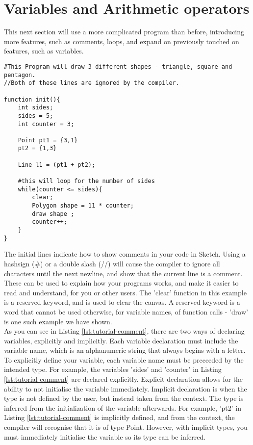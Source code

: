 \documentclass{l3proj}
\begin{document}
\section{Variables and Arithmetic operators}
\label{vars}
This next section will use a more complicated program than before, introducing more features, such as comments, loops, and expand on previously touched on features, such as variables.
\begin{lstlisting}[caption={Comments and Point Addition},label={lst:tutorial-comment}]
#This Program will draw 3 different shapes - triangle, square and pentagon.
//Both of these lines are ignored by the compiler.

function init(){
	int sides;
	sides = 5;
    int counter = 3;
    
    Point pt1 = {3,1}
    pt2 = {1,3}
    
    Line l1 = (pt1 + pt2);
    
    #this will loop for the number of sides
    while(counter <= sides){
        clear;
        Polygon shape =	11 * counter;
        draw shape ;
        counter++;
    }
}
\end{lstlisting}
The initial lines indicate how to show comments in your code in Sketch. Using a hashsign (\#) or a double slash (//) will cause the compiler to ignore all characters until the next newline, and show that the current line is a comment. These can be used to explain how your programs works, and make it easier to read and understand, for you or other users. The 'clear' function in this example is a reserved keyword, and is used to clear the canvas. A reserved keyword is a word that cannot be used otherwise, for variable names, of function calls - 'draw' is one such example we have shown.
\\ [12pt]
As you can see in Listing \ref{lst:tutorial-comment}, there are two ways of declaring variables, explicitly and implicitly. Each variable declaration must include the variable name, which is an alphanumeric string that always begins with a letter. To explicitly define your variable, each variable name must be preceeded by the intended type. For example, the variables 'sides' and 'counter' in Listing \ref{lst:tutorial-comment} are declared explicitly. Explicit declaration allows for the ability to not initialise the variable immediately. Implicit declaration is when the type is not defined by the user, but instead taken from the context. The type is inferred from the initialization of the variable afterwards. For example, 'pt2' in Listing \ref{lst:tutorial-comment} is implicitly defined, and from the context, the compiler will recognise that it is of type Point. However, with implicit types, you must immediately initialise the variable so its type can be inferred.
\end{document}

